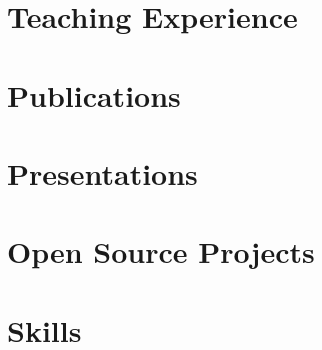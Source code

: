 \documentclass[a4paper,11pt]{article}
\begin{document}
\section{Teaching Experience}
    \begin{itemize}
        \lecturer
            \cvItemizeBegin
                \lecturerA
                \lecturerB
            \cvItemizeEnd
        \supervision
            \cvItemizeBegin
                \supervisionA
                \supervisionB
                \supervisionC
                \supervisionD
                \supervisionE
                \supervisionF
                \supervisionG
            \cvItemizeEnd
    \end{itemize}

\section{Publications}
    \publicationItemizeBegin
        \publicationInCIT
        \publicationPhdThesis
        \publicationAAAI
        \publicationPopulationCoded
        \publicationSpikingTransformer
        \publicationRateCoded
        \publicationEncodingSurvey
        \publicationBernstainTwo
        \publicationDAICAFGR
        \publicationDAICANN
        \publicationBernsteinOne
        \publicationBernsteinDA
        \publicationReport
    \publicationItemizeEnd

\section{Presentations}
    \presentations %

\section{Open Source Projects}
    \begin{itemize}
        \fossConnectogenesis
            \cvItemizeBegin
                \fossConnectogenesisA
                \fossConnectogenesisB
            \cvItemizeEnd
        \fossConvSnn
            \cvItemizeBegin
                \fossConvSnnA
                \fossConvSnnB
            \cvItemizeEnd
    \end{itemize}

\section{Skills}
    \begin{itemize}
        \skillsProgramming
        \skillsLanguages
        \skillsInterests
    \end{itemize}
\end{document}
